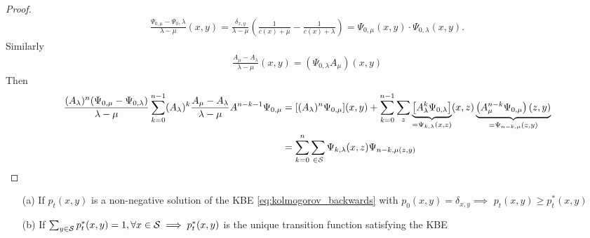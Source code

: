 \begin{proof}
    \begin{align*}
        \frac{\Psi_{0,\mu}-\Psi_0,\lambda}{\lambda-\mu}(x,y)=\frac{\delta_{x,y}}{\lambda-\mu}\left(\frac{1}{c(x)+\mu}-\frac{1}{c(x)+\lambda}\right)=\Psi_{0,\mu}(x,y)\cdot \Psi_{0,\lambda}(x,y).
    \end{align*}
    Similarly
    \begin{align*}
        \frac{A_\mu-A_\lambda}{\lambda-\mu}(x,y)=\left(\Psi_{0,\lambda}A_\mu\right)(x,y)
    \end{align*}
    Then 
    \begin{align*}
        \frac{(A_\lambda)^n (\Psi_{0,\mu}-\Psi_{0,\lambda})}{\lambda-\mu}\sum_{k=0}^{n-1} (A_\lambda)^k\frac{A_\mu-A_\lambda}{\lambda-\mu}A^{n-k-1}\Psi_{0,\mu} &= [(A_\lambda)^n\Psi_{0,\mu}](x,y)+\sum_{k=0}^{n-1}\sum_{z}\underbrace{\left[A_\lambda^k\Psi_{0,\lambda}\right]}_{=\Psi_{k,\lambda}(x,z)}(x,z)\underbrace{\left(A_\mu^{n-k}\Psi_{0,\mu}\right)(z,y)}_{=\Psi_{n-k,\mu}(z,y)}\\
        &=\sum_{k=0}^n \sum_{\in\mathcal{S}} \Psi_{k,\lambda}(x,z)\Psi_{n-k,\mu(z,y)}\qedhere
    \end{align*}

\end{proof}


\begin{theorem}\label{thm:1.19}
    \begin{enumerate}
        \item[(a)] If \(p_t(x,y)\) is a non-negative solution of the KBE \ref{eq:kolmogorov_backwards} with 
                   \(p_0(x,y)=\delta_{x,y}\implies\) \(p_t(x,y)\geq p_t^*(x,y)\)
        \item[(b)] If \(\sum_{y\in \mathcal{S}}p_t^*(x,y)=1,\forall x\in\mathcal{S}\implies p_t^*(x,y)\) is the unique transition function satisfying the KBE    
    \end{enumerate}
\end{theorem}

